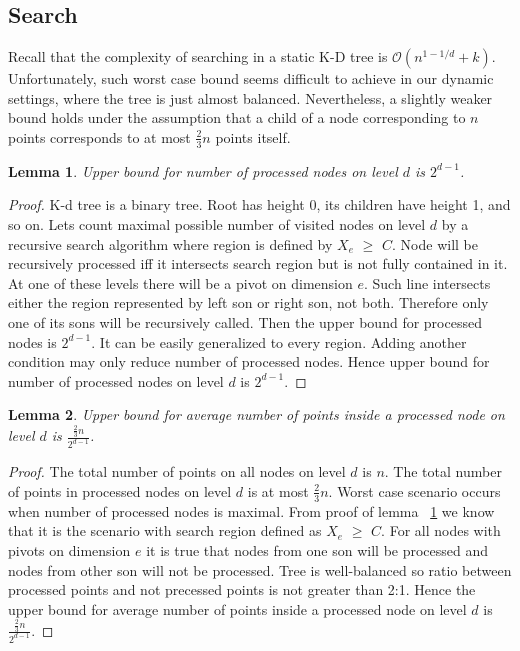 \documentclass[10pt,a4paper]{article}
\newtheorem{lemma}{Lemma}
\newcommand{\Oh}{\mathcal{O}}
\begin{document}
\subsection{Search}

Recall that the complexity of searching in a static K-D tree is $\Oh(n^{1-1/d} + k)$. Unfortunately, such worst case bound seems difficult to achieve in our dynamic settings, where the tree is just almost balanced. Nevertheless, a slightly weaker bound holds under the assumption that a child of a node corresponding to $n$ points corresponds to at most $\frac{2}{3}n$ points itself.

\begin{lemma}\label{lem:3}
Upper bound for number of processed nodes on level $d$ is $2^{d-1}$.
\end{lemma}

\begin{proof}

K-d tree is a binary tree. Root has height 0, its children have height 1, and so on. Lets count maximal possible number of visited nodes on level $d$ by a recursive search algorithm where region is defined by $X_e$ $\geq$ $C$. Node will be recursively processed iff it intersects search region but is not fully contained in it. At one of these levels there will be a pivot on dimension $e$. Such line intersects either the region represented by left son or right son, not both. Therefore only one of its sons will be recursively called. Then the upper bound for processed nodes is $2^{d-1}$. It can be easily generalized to every region. Adding another condition may only reduce number of processed nodes. Hence upper bound for number of processed nodes on level $d$ is $2^{d-1}$. 
\end{proof}


\begin{lemma}\label{lem:4}
Upper bound for average number of points inside a processed node on level $d$ is $\frac{\frac{2}{3}n}{2^{d-1}}$.
\end{lemma}

\begin{proof}

The total number of points on all nodes on level $d$ is $n$. The total number of points in processed nodes on level $d$ is at most $\frac{2}{3}n$. Worst case scenario occurs when number of processed nodes is maximal. From proof of lemma ~\ref{lem:3} we know that it is the scenario with search region defined as $X_e$ $\geq$ $C$. For all nodes with pivots on dimension $e$ it is true that nodes from one son will be processed and nodes from other son will not be processed. Tree is well-balanced so ratio between processed points and not precessed points is not greater than 2:1. Hence the upper bound for average number of points inside a processed node on level $d$ is $\frac{\frac{2}{3}n}{2^{d-1}}$.
\end{proof}
\end{document}
